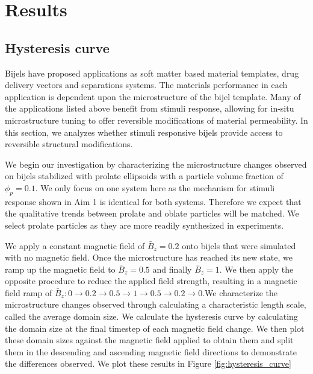 \section{Results}\label{sec:results_p2}
\subsection{Hysteresis curve}\label{section:hysteresis_curve}

Bijels have proposed applications as soft matter based material templates, drug delivery vectors and separations systems. The materials 
performance in each application is dependent upon the microstructure of the bijel template. Many of the applications listed above benefit 
from stimuli response, allowing for in-situ microstructure tuning to offer reversible modifications of material permeability. In this section, we analyzes
whether stimuli responsive bijels provide access to reversible structural modifications.

We begin our investigation by characterizing the microstructure changes observed on bijels stabilized with prolate ellipsoids with a 
particle volume fraction of $\phi_p = 0.1$. We only focus on one system here as the mechanism for stimuli response shown in Aim 1 is identical
for both systems. Therefore we expect that the qualitative trends between prolate and oblate particles will be matched. We select prolate particles
as they are more readily synthesized in experiments. 

We apply a constant magnetic field of $\bar{B}_z = 0.2$ onto bijels that were simulated 
with no magnetic field. Once the microstructure has reached its new state, we ramp up the magnetic field to $\bar{B}_z = 0.5$ and 
finally $\bar{B}_z = 1$. We then apply the opposite procedure to reduce the applied field strength, resulting in a magnetic field 
ramp of $\bar{B}_z: 0 \rightarrow 0.2 \rightarrow 0.5 \rightarrow 1 \rightarrow 0.5 \rightarrow 0.2 \rightarrow 0$.We characterize the 
microstructure changes observed through calculating a characteristic length scale, called the average domain size. We calculate the hysteresis 
curve by calculating the domain size at the final timestep of each magnetic field change. We then plot these domain sizes against the magnetic field 
applied to obtain them and split them in the descending and ascending magnetic field directions to demonstrate the differences observed. We plot 
these results in Figure \ref{fig:hysteresis_curve}

